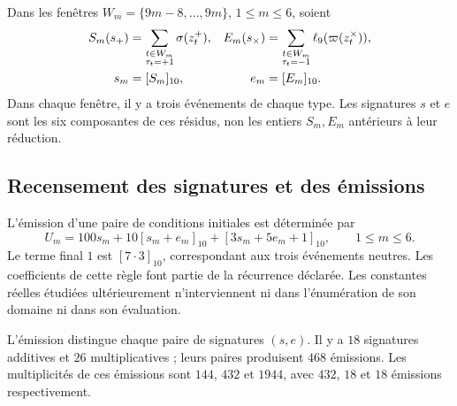Dans les fenêtres $W_m=\{9m-8,\ldots,9m\}$, $1\le m\le6$, soient
\begin{align}
 S_m(s_+)&=\sum_{\substack{t\in W_m\\\tau_t=+1}}
                 \sigma(z_t^+),&
 E_m(s_\times)&=\sum_{\substack{t\in W_m\\\tau_t=-1}}
                 \ell_9(\varpi(z_t^\times)),
 \label{iii:iii:nf-firmas}\\
 s_m&=[S_m]_{10},&e_m&=[E_m]_{10}.\notag
\end{align}
Dans chaque fenêtre, il y a trois événements de chaque type. Les signatures $s$ et $e$
sont les six composantes de ces résidus, non les entiers $S_m,E_m$
antérieurs à leur réduction.

\subsection{Recensement des signatures et des émissions}

L’émission d’une paire de conditions initiales est déterminée par
\begin{equation}
 U_m=100s_m+10[s_m+e_m]_{10}+[3s_m+5e_m+1]_{10},
 \qquad 1\le m\le6.
 \label{iii:iii:nf-emision}
\end{equation}
Le terme final $1$ est $[7\cdot3]_{10}$, correspondant aux trois
événements neutres. Les coefficients de cette règle font partie de la
récurrence déclarée. Les constantes réelles étudiées ultérieurement
n’interviennent ni dans l’énumération de son domaine ni dans son évaluation.

\begin{proposition}
\label{iii:iii:nf-inyectividad}
L’émission distingue chaque paire de signatures $(s,e)$. Il y a $18$ signatures
additives et $26$ multiplicatives ; leurs paires produisent $468$ émissions.
Les multiplicités de ces émissions sont $144$, $432$ et $1944$,
avec $432$, $18$ et $18$ émissions respectivement.
\end{proposition}

